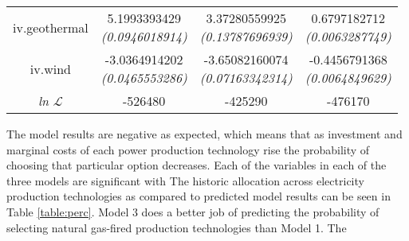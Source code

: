 \documentclass[10pt]{amsart}
\begin{document}
\begin{table}[H]
\begin{tabular}{c c c c}
iv.geothermal & \makecell{5.1993393429 \\ {\footnotesize\textit{(0.0946018914)}}} & \makecell{3.37280559925 \\ {\footnotesize\textit{(0.13787696939)}}} & \makecell{0.6797182712 \\ {\footnotesize\textit{(0.0063287749)}}} \\
iv.wind & \makecell{-3.0364914202 \\ {\footnotesize\textit{(0.0465553286)}}} & \makecell{-3.65082160074 \\ {\footnotesize\textit{(0.07163342314)}}} & \makecell{-0.4456791368 \\ {\footnotesize\textit{(0.0064849629)}}} \\ 
\hline
\textit{ln} $\mathcal{L}$ & -526480 & -425290 & -476170 \\ [1ex]
\hline
\hline
\end{tabular}
\label{table:nl.1}
\end{table}

The model results are negative as expected, which means that as investment and marginal costs of each power production technology rise the probability of choosing that particular option decreases. 
Each of the variables in each of the three models are significant with 
The historic allocation across electricity production technologies as compared to predicted model results can be seen in Table \ref{table:perc}.
Model 3 does a better job of predicting the probability of selecting natural gas-fired production technologies than Model 1. 
The 
\end{document}
